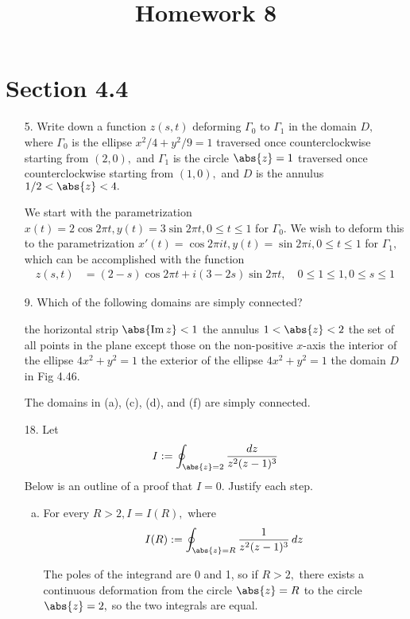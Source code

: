 \documentclass{article}
\DeclareMathOperator{\im}{Im}
\begin{document}
\title{Homework 8}
\maketitle
\thispagestyle{fancy}

\section*{Section 4.4}

\begin{itemize}
	\item[5.] Write down a function $z(s, t)$ deforming $\Gamma_0$ to $\Gamma_1$ in the domain $D,$ where $\Gamma_0$ is the ellipse $x^2/4+y^2/9=1$ traversed once counterclockwise starting from $(2, 0),$ and $\Gamma_1$ is the circle $\abs{z}=1$ traversed once counterclockwise starting from $(1, 0),$ and $D$ is the annulus $1/2<\abs{z}<4.$
		\begin{soln}
			We start with the parametrization $x(t)=2\cos 2\pi t, y(t)=3\sin 2\pi t, 0\le t\le 1$ for $\Gamma_0.$ We wish to deform this to the parametrization $x'(t) = \cos 2\pi it, y(t)=\sin 2\pi i, 0\le t\le 1$ for $\Gamma_1,$ which can be accomplished with the function
			\begin{align*}
				z(s, t) &= (2-s)\cos 2\pi t + i(3-2s)\sin 2\pi t, \quad 0\le 1\le 1, 0\le s\le 1
			\end{align*}
		\end{soln}

	\item[9.] Which of the following domains are simply connected?
		\begin{enumerate}[(a)]
			\ii the horizontal strip $\abs{\im z}<1$
			\ii the annulus $1<\abs{z}<2$
			\ii the set of all points in the plane except those on the non-positive $x$-axis
			\ii the interior of the ellipse $4x^2+y^2=1$
			\ii the exterior of the ellipse $4x^2+y^2=1$
			\ii the domain $D$ in Fig 4.46.
		\end{enumerate}
		\begin{answer*}
			The domains in (a), (c), (d), and (f) are simply connected.
		\end{answer*}

	\item[18.] Let
		\begin{align*}
			I:= \oint_{\abs{z}=2} \frac{dz}{z^2(z-1)^3}
		\end{align*}
		Below is an outline of a proof that $I=0.$ Justify each step.
		\begin{enumerate}[(a)]
			\item For every $R>2, I=I(R),$ where
				\begin{align*}
					I(R) := \oint_{\abs{z}=R} \frac{1}{z^2(z-1)^3}\, dz
				\end{align*}
				\begin{answer*}
					The poles of the integrand are 0 and 1, so if $R>2,$ there exists a continuous deformation from the circle $\abs{z}=R$ to the circle $\abs{z}=2,$ so the two integrals are equal.
				\end{answer*}


\end{enumerate}
\end{itemize}
\end{document}
